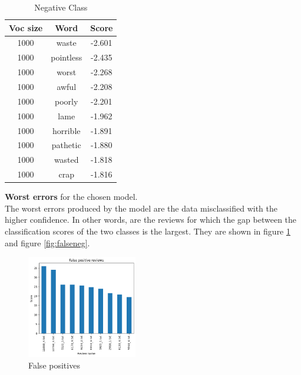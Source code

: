 \documentclass{article}
\begin{document}
\begin{multicols}{2}
    \begin{table}[H]
        \centering
        \small
        \caption{\small Negative Class}
        \label{tab:negative_class_impact}
        \begin{tabular}{ |c|c|c| } 
        \hline
        \textbf{Voc size} & \textbf{Word} & \textbf{Score} \\ \hline
        1000 & waste & -2.601 \\ \hline
        1000 & pointless & -2.435 \\ \hline
        1000 & worst & -2.268 \\ \hline
        1000 & awful & -2.208 \\ \hline
        1000 & poorly & -2.201 \\ \hline
        1000 & lame & -1.962 \\ \hline
        1000 & horrible & -1.891 \\ \hline
        1000 & pathetic & -1.880 \\ \hline
        1000 & wasted & -1.818 \\ \hline
        1000 & crap & -1.816 \\ \hline
        \end{tabular}
    \end{table}

\noindent
\textbf{Worst errors} for the chosen model.\\
The worst errors produced by the model are the data misclassified with the higher confidence. In other words, are the reviews for which the gap between the
classification scores of the two classes is the largest. They are shown in figure \ref{fig:falsepos} and figure \ref{fig:falseneg}.

\vspace{0.3cm}

    \begin{figure}[H]
        \centering
        \includegraphics[width=0.43\textwidth]{false_positives.png}
        \caption{\small False positives}
        \label{fig:falsepos}
    \end{figure}


\end{multicols}
\end{document}
